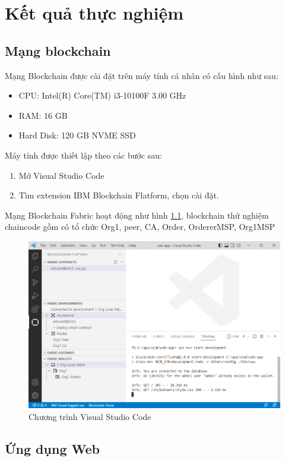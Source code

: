 \chapter{Kết quả thực nghiệm}
\section{Mạng blockchain}
Mạng Blockchain được cài đặt  trên máy tính cá nhân có cấu hình như sau:
\begin{itemize}
\item CPU: Intel(R) Core(TM) i3-10100F 3.00 GHz
\item RAM: 16 GB
\item Hard Disk: 120 GB NVME SSD
\end{itemize}

Máy tính được thiết lập theo các bước sau:
\begin{enumerate}
\item Mở Visual Studio Code 
\item Tìm extension IBM Blockchain Flatform, chọn cài đặt.
\end{enumerate}
Mạng Blockchain Fabric hoạt động như hình \ref{fig:ide_start}, blockchain thử nghiệm chaincode gồm có tổ chức Org1, peer, CA, Order, OrdererMSP, Org1MSP

\begin{figure}[htbp]
\centering
\includegraphics[width=.9\linewidth]{img/ide_start.PNG}
\caption{Chương trình Visual Studio Code}
\label{fig:ide_start}
\end{figure}

\section{Ứng dụng Web}

